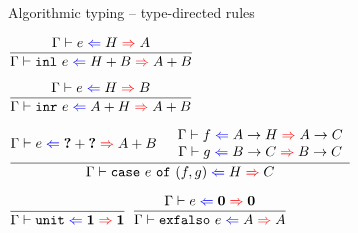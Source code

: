 \documentclass{beamer}
\begin{document}
\begin{frame}{Algorithmic typing -- type-directed rules}

\begin{center}
  $\infrule{\hinting{e}{H}{A}}{\hinting{\inl{e}}{\Sum{H}{B}}{\Sum{A}{B}}}$

  \vspace{2em}

  $\infrule{\hinting{e}{H}{B}}{\hinting{\inr{e}}{\Sum{A}{H}}{\Sum{A}{B}}}$

  \vspace{2em}

  $\infrule{\hinting{e}{\Sum{\Hole}{\Hole}}{\Sum{A}{B}} \quad \begin{array}{c} \hinting{f}{\Fun{A}{H}}{\Fun{A}{C}} \\ \hinting{g}{\Fun{B}{C}}{\Fun{B}{C}} \end{array}}{\hinting{\case{e}{f}{g}}{H}{C}}$

  \vspace{2em}

  $\infrule{}{\hinting{\unit}{\Unit}{\Unit}}$ \quad
  $\infrule{\hinting{e}{\Empty}{\Empty}}{\hinting{\exfalso{e}}{A}{A}}$
\end{center}

\end{frame}
\end{document}
